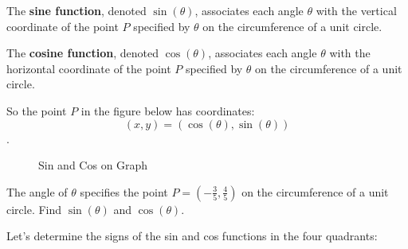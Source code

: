 \begin{definition}
  \label{def:sine_and_cosine}

  The \textbf{sine function}, denoted $\sin(\theta)$, associates each angle
  $\theta$ with the vertical coordinate of the point $P$ specified by $\theta$
  on the circumference of a unit circle.

  The \textbf{cosine function}, denoted $\cos(\theta)$, associates each angle
  $\theta$ with the horizontal coordinate of the point $P$ specified by
  $\theta$ on the circumference of a unit circle.

  So the point $P$ in the figure below has coordinates:
  \[ (x, y) = (\cos(\theta), \sin(\theta)) \].

  \begin{figure}[H]
    \centering


    \caption{Sin and Cos on Graph}
    \label{fig:sin_and_cos}
  \end{figure}
\end{definition}

\begin{exc}
  \label{exc:angle_of_theta}

  The angle of $\theta$ specifies the point
  $P = \left(-\frac{3}{5}, \frac{4}{5}\right)$ on the circumference
  of a unit circle. Find $\sin(\theta)$ and $\cos(\theta)$.
\end{exc}

Let's determine the signs of the sin and cos functions in the four
quadrants:

